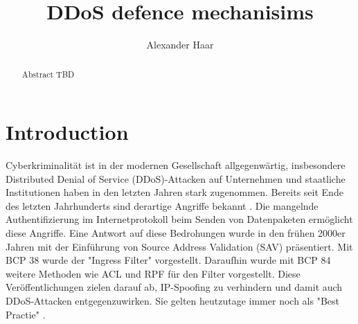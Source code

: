 \documentclass[sigplan,screen]{acmart}
\begin{document}
\title{DDoS defence mechanisims}

\author{Alexander Haar}

\begin{abstract}
  Abstract TBD
\end{abstract}



\maketitle

\section{Introduction}
Cyberkriminalität ist in der modernen Gesellschaft allgegenwärtig, insbesondere Distributed Denial of Service (DDoS)-Attacken auf Unternehmen und staatliche Institutionen haben in den letzten Jahren stark zugenommen. Bereits seit Ende des letzten Jahrhunderts sind derartige Angriffe bekannt \cite{manrs01}. Die mangelnde Authentifizierung im Internetprotokoll beim Senden von Datenpaketen ermöglicht diese Angriffe. Eine Antwort auf diese Bedrohungen wurde in den frühen 2000er Jahren mit der Einführung von Source Address Validation (SAV) präsentiert. Mit BCP 38 \cite{Ingress01} wurde der "Ingress Filter" vorgestellt. Daraufhin wurde mit BCP 84\cite{Bcp84} weitere Methoden wie ACL und RPF für den Filter vorgestellt. Diese Veröffentlichungen zielen darauf ab, IP-Spoofing zu verhindern und damit auch DDoS-Attacken entgegenzuwirken. Sie gelten heutzutage immer noch als "Best Practie" \cite{Hal01}. 
\end{document}
